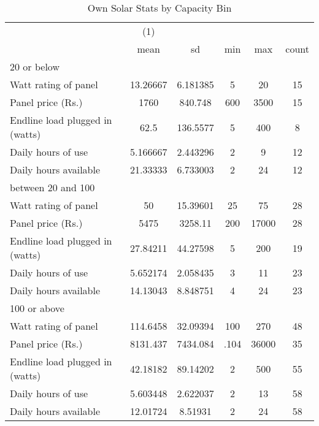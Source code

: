 \begin{table}[htbp]\centering
\def\sym#1{\ifmmode^{#1}\else\(^{#1}\)\fi}
\caption{Own Solar Stats by Capacity Bin\label {tab1}}
\begin{tabular}{l*{1}{ccccc}}
\toprule
                    &\multicolumn{1}{c}{(1)}&            &            &            &            \\
                    &        mean&          sd&         min&         max&       count\\
\midrule
20 or below         &            &            &            &            &            \\
Watt rating of panel&    13.26667&    6.181385&           5&          20&          15\\
Panel price (Rs.)   &        1760&     840.748&         600&        3500&          15\\
Endline load plugged in (watts)&        62.5&    136.5577&           5&         400&           8\\
Daily hours of use  &    5.166667&    2.443296&           2&           9&          12\\
Daily hours available&    21.33333&    6.733003&           2&          24&          12\\
\midrule
between 20 and 100  &            &            &            &            &            \\
Watt rating of panel&          50&    15.39601&          25&          75&          28\\
Panel price (Rs.)   &        5475&     3258.11&         200&       17000&          28\\
Endline load plugged in (watts)&    27.84211&    44.27598&           5&         200&          19\\
Daily hours of use  &    5.652174&    2.058435&           3&          11&          23\\
Daily hours available&    14.13043&    8.848751&           4&          24&          23\\
\midrule
100 or above        &            &            &            &            &            \\
Watt rating of panel&    114.6458&    32.09394&         100&         270&          48\\
Panel price (Rs.)   &    8131.437&    7434.084&        .104&       36000&          35\\
Endline load plugged in (watts)&    42.18182&    89.14202&           2&         500&          55\\
Daily hours of use  &    5.603448&    2.622037&           2&          13&          58\\
Daily hours available&    12.01724&     8.51931&           2&          24&          58\\
\bottomrule
\end{tabular}
\end{table}
